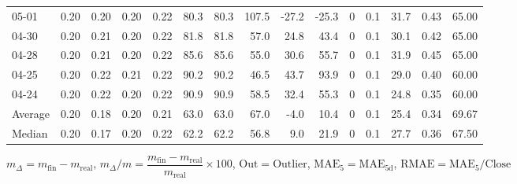 \begin{threeparttable}
{\begin{tabular}{lrrrrrrrrrrrrrr}
  05-01 &          0.20 &          0.20 &          0.20 &        0.22 &                80.3 &               80.3 &               107.5 &      -27.2 &        -25.3 &              0 &                 0.1 &             31.7 &            0.43 &                  65.00 \\
  04-30 &          0.20 &          0.21 &          0.20 &        0.22 &                81.8 &               81.8 &                57.0 &       24.8 &         43.4 &              0 &                 0.1 &             30.1 &            0.42 &                  65.00 \\
  04-28 &          0.20 &          0.21 &          0.20 &        0.22 &                85.6 &               85.6 &                55.0 &       30.6 &         55.7 &              0 &                 0.1 &             31.9 &            0.45 &                  65.00 \\
  04-25 &          0.20 &          0.22 &          0.21 &        0.22 &                90.2 &               90.2 &                46.5 &       43.7 &         93.9 &              0 &                 0.1 &             29.0 &            0.40 &                  60.00 \\
  04-24 &          0.20 &          0.22 &          0.20 &        0.22 &                90.9 &               90.9 &                58.5 &       32.4 &         55.3 &              0 &                 0.1 &             24.8 &            0.35 &                  60.00 \\
Average &          0.20 &          0.18 &          0.20 &        0.21 &                63.0 &               63.0 &                67.0 &       -4.0 &         10.4 &              0 &                 0.1 &             25.4 &            0.34 &                  69.67 \\
 Median &          0.20 &          0.17 &          0.20 &        0.22 &                62.2 &               62.2 &                56.8 &        9.0 &         21.9 &              0 &                 0.1 &             27.7 &            0.36 &                  67.50 \\
\bottomrule
\end{tabular}
}
\begin{tablenotes}\footnotesize
\item $m_\Delta=m_{\text{fin}}-m_{\text{real}}$,
$m_\Delta/m=\dfrac{m_{\text{fin}}-m_{\text{real}}}{m_{\text{real}}}\times100$,
$\mathrm{Out}=\text{Outlier}$,
$\mathrm{MAE}_5=\mathrm{MAE}_{5\text{d}}$,
$\mathrm{RMAE}=\mathrm{MAE}_5/\text{Close}$
\end{tablenotes}
\end{threeparttable}
\endgroup

